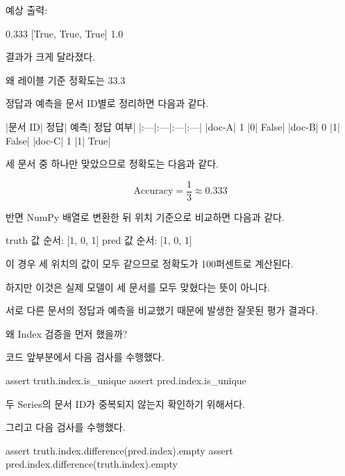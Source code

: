 예상 출력:

\begin{dhkzsh}
0.333
[True, True, True]
1.0
\end{dhkzsh}

결과가 크게 달라졌다.

\begin{dhknote}
\begin{dhksmry}[centered]
왜 레이블 기준 정확도는 33.3%
\end{dhksmry}
\end{dhknote}

정답과 예측을 문서 ID별로 정리하면 다음과 같다.

\begin{dhktable}
|문서 ID|	정답|	예측|	정답 여부|
|:---|:---|:---|:---|
|doc-A|	1	|0|	False|
|doc-B|	0	|1|	False|
|doc-C|	1	|1|	True|
\end{dhktable}

세 문서 중 하나만 맞았으므로 정확도는 다음과 같다.

\[
\text{Accuracy}=\frac{1}{3}\approx0.333
\]

반면 NumPy 배열로 변환한 뒤 위치 기준으로 비교하면 다음과 같다.

\begin{dhkzsh}
truth 값 순서: [1, 0, 1]
pred 값 순서:  [1, 0, 1]
\end{dhkzsh}

이 경우 세 위치의 값이 모두 같으므로 정확도가 100퍼센트로 계산된다.

하지만 이것은 실제 모델이 세 문서를 모두 맞혔다는 뜻이 아니다.

서로 다른 문서의 정답과 예측을 비교했기 때문에 발생한 잘못된 평가 결과다.

\begin{dhknote}
\begin{dhksmry}[centered]
왜 Index 검증을 먼저 했을까?
\end{dhksmry}
\end{dhknote}

코드 앞부분에서 다음 검사를 수행했다.

\begin{dhkcode}
assert truth.index.is_unique
assert pred.index.is_unique
\end{dhkcode}

두 Series의 문서 ID가 중복되지 않는지 확인하기 위해서다.

그리고 다음 검사를 수행했다.

\begin{dhkcode}
assert truth.index.difference(pred.index).empty
assert pred.index.difference(truth.index).empty
\end{dhkcode}

